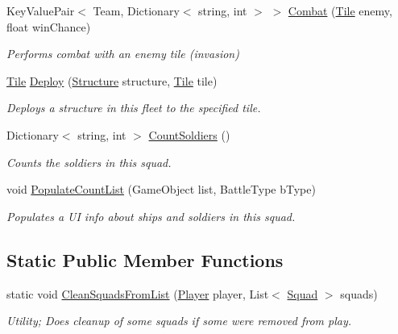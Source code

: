 \begin{DoxyCompactItemize}
Key\+Value\+Pair$<$ Team, Dictionary$<$ string, int $>$ $>$ \hyperlink{class_squad_a9ffa0d9aac3ce662d1fcc6034f2b6129}{Combat} (\hyperlink{class_tile}{Tile} enemy, float win\+Chance)
\begin{DoxyCompactList}\small\item\em Performs combat with an enemy tile (invasion) \end{DoxyCompactList}\item 
\hyperlink{class_tile}{Tile} \hyperlink{class_squad_a72fd0fcfdbb9a4880df8dc58cd170c6c}{Deploy} (\hyperlink{class_structure}{Structure} structure, \hyperlink{class_tile}{Tile} tile)
\begin{DoxyCompactList}\small\item\em Deploys a structure in this fleet to the specified tile. \end{DoxyCompactList}\item 
Dictionary$<$ string, int $>$ \hyperlink{class_squad_a04adb494ca4424058756b487b1e7a3c1}{Count\+Soldiers} ()
\begin{DoxyCompactList}\small\item\em Counts the soldiers in this squad. \end{DoxyCompactList}\item 
void \hyperlink{class_squad_a7c27a69c356df81a05846bb6d08a4b69}{Populate\+Count\+List} (Game\+Object list, Battle\+Type b\+Type)
\begin{DoxyCompactList}\small\item\em Populates a U\+I info about ships and soldiers in this squad. \end{DoxyCompactList}\end{DoxyCompactItemize}
\subsection*{Static Public Member Functions}
\begin{DoxyCompactItemize}
\item 
static void \hyperlink{class_squad_a4c9e30d6ca34d7fd1789c6d7dd0513f1}{Clean\+Squads\+From\+List} (\hyperlink{class_player}{Player} player, List$<$ \hyperlink{class_squad}{Squad} $>$ squads)
\begin{DoxyCompactList}\small\item\em Utility; Does cleanup of some squads if some were removed from play. \end{DoxyCompactList}\end{DoxyCompactItemize}
